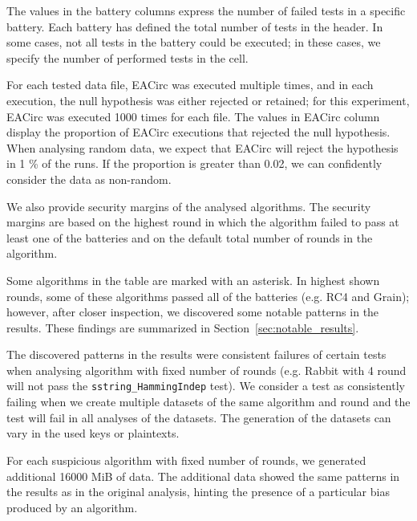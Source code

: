 \documentclass[
	digital,    %
	oneside,
	color,
	11pt,
	nocover,
	notable,
	nolof,
	nolot,
]{fithesis3}
\theoremstyle{definition}
\theoremstyle{remark}
\begin{document}
The values in the battery columns express the number of failed tests in a specific battery. Each battery has defined the total number of tests in the header. In some cases, not all tests in the battery could be executed; in these cases, we specify the number of performed tests in the cell. 

For each tested data file, EACirc was executed multiple times, and in each execution, the null hypothesis was either rejected or retained; for this experiment, EACirc was executed 1000 times for each file. The values in EACirc column display the proportion of EACirc executions that rejected the null hypothesis. When analysing random data, we expect that EACirc will reject the hypothesis in 1 \% of the runs. If the proportion is greater than 0.02, we can confidently consider the data as non-random.

We also provide security margins of the analysed algorithms. The security margins are based on the highest round in which the algorithm failed to pass at least one of the batteries and on the default total number of rounds in the algorithm.

Some algorithms in the table are marked with an asterisk. In highest shown rounds, some of these algorithms passed all of the batteries (e.g. RC4 and Grain); however, after closer inspection, we discovered some notable patterns in the results. These findings are summarized in Section~\ref{sec:notable_results}.

The discovered patterns in the results were consistent failures of certain tests when analysing algorithm with fixed number of rounds (e.g. Rabbit with 4 round will not pass the \texttt{sstring\_HammingIndep} test). We consider a test as consistently failing when we create multiple datasets of the same algorithm and round and the test will fail in all analyses of the datasets. The generation of the datasets can vary in the used keys or plaintexts.

For each suspicious algorithm with fixed number of rounds, we generated additional 16000 MiB of data. The additional data showed the same patterns in the results as in the original analysis, hinting the presence of a particular bias produced by an algorithm.
\end{document}
